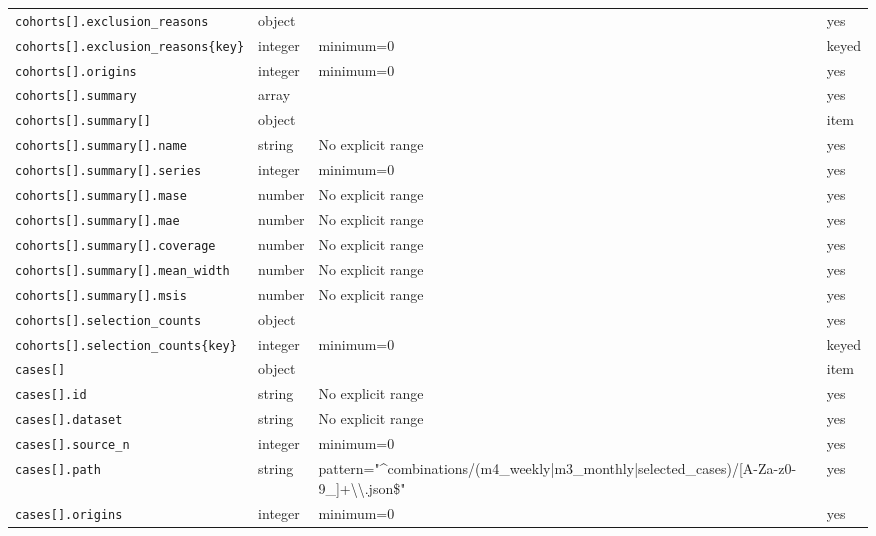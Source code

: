 \begin{longtable}{@{}p{}p{}p{}p{}@{}}
\texttt{cohorts[].\allowbreak{}exclusion\_\allowbreak{}reasons} & object &  & yes\\
\texttt{cohorts[].\allowbreak{}exclusion\_\allowbreak{}reasons\{key\}} & integer & minimum=0 & keyed\\
\texttt{cohorts[].\allowbreak{}origins} & integer & minimum=0 & yes\\
\texttt{cohorts[].\allowbreak{}summary} & array &  & yes\\
\texttt{cohorts[].\allowbreak{}summary[]} & object &  & item\\
\texttt{cohorts[].\allowbreak{}summary[].\allowbreak{}name} & string & No explicit range & yes\\
\texttt{cohorts[].\allowbreak{}summary[].\allowbreak{}series} & integer & minimum=0 & yes\\
\texttt{cohorts[].\allowbreak{}summary[].\allowbreak{}mase} & number & No explicit range & yes\\
\texttt{cohorts[].\allowbreak{}summary[].\allowbreak{}mae} & number & No explicit range & yes\\
\texttt{cohorts[].\allowbreak{}summary[].\allowbreak{}coverage} & number & No explicit range & yes\\
\texttt{cohorts[].\allowbreak{}summary[].\allowbreak{}mean\_\allowbreak{}width} & number & No explicit range & yes\\
\texttt{cohorts[].\allowbreak{}summary[].\allowbreak{}msis} & number & No explicit range & yes\\
\texttt{cohorts[].\allowbreak{}selection\_\allowbreak{}counts} & object &  & yes\\
\texttt{cohorts[].\allowbreak{}selection\_\allowbreak{}counts\{key\}} & integer & minimum=0 & keyed\\
\texttt{cases[]} & object &  & item\\
\texttt{cases[].\allowbreak{}id} & string & No explicit range & yes\\
\texttt{cases[].\allowbreak{}dataset} & string & No explicit range & yes\\
\texttt{cases[].\allowbreak{}source\_\allowbreak{}n} & integer & minimum=0 & yes\\
\texttt{cases[].\allowbreak{}path} & string & pattern="\textasciicircum{}combinations/(m4\_\allowbreak{}weekly|m3\_\allowbreak{}monthly|selected\_\allowbreak{}cases)/[A-Za-z0-9\_\allowbreak{}]+\textbackslash{}\textbackslash{}.json\$" & yes\\
\texttt{cases[].\allowbreak{}origins} & integer & minimum=0 & yes\\

\end{longtable}
